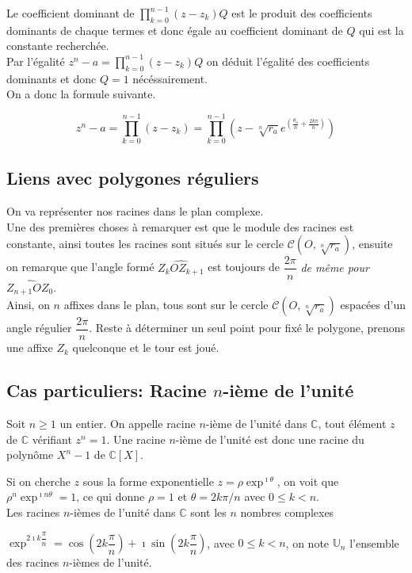 \documentclass[french]{book}
\newcommand{\bbc}{\mathbb {C}}
\newcommand{\se}{\geq}
\newcommand{\ie}{\leq}
\newcommand{\calc}{\mathscr{C}}
\begin{document}
Le coefficient dominant de $\prod^{n-1}_{k=0}(z-z_k)Q$ est le produit des coefficients dominants de chaque termes et donc égale au coefficient dominant de $Q$ qui est la constante recherchée.\\

Par l'égalité $z^n-a=\prod^{n-1}_{k=0}(z-z_k)Q$ on déduit l'égalité des coefficients dominants et donc $Q=1$ nécéssairement. \\

On a donc la formule suivante. 

$$z^n-a= \prod^{n-1}_{k=0}(z-z_k) =\prod^{n-1}_{k=0}(z-\sqrt[n]{r_a}e^{(  
\frac{\theta_a}{n} +\frac{2k\pi}{n} )} )$$

\subsection{Liens avec polygones réguliers}
On va représenter nos racines dans le plan complexe.\\

Une des premières choses à remarquer est que le module des racines est constante, ainsi toutes les racines sont situés sur le cercle $\calc (O,\sqrt[n]{r_a})$, ensuite on remarque que l'angle formé $\widehat{Z_kOZ_{k+1}}$ est toujours de $\dfrac{2\pi}{n}$ \emph{de même pour $\widehat{Z_{n+1}OZ_0}$}.\\

Ainsi, on $n$ affixes dans le plan,  tous sont sur le cercle $\calc (O,\sqrt[n]{r_a})$ espacées d'un angle régulier  $\dfrac{2\pi}{n}$. Reste à déterminer un seul point pour fixé le polygone, prenons une affixe $Z_k$ quelconque et le tour est joué.


\subsection{Cas particuliers: Racine  $n$-ième de l'unité}
Soit $n\se 1$ un entier. On appelle racine $n$-ième de l'unité dans  $\bbc$, tout élément $z$ de $\bbc$ vérifiant $z^n=1$. Une racine $n$-ième de l'unité est donc une racine du polynôme $X^n-1$ de $\bbc [X]$.\par
Si on cherche $z$ sous la forme exponentielle $z=\rho\exp^{\imath \theta}$, on voit que $\rho^n\exp^{\imath n\theta}=1$, ce qui donne $\rho=1$ et $\theta=2k\pi/n$ avec $0\ie k<n$.\\

 Les racines  $n$-ièmes de l'unité dans $\bbc$ sont les $n$ nombres complexes

 $\exp^{2\imath k\dfrac{\pi}{n}}=\cos(2k\dfrac{\pi}{n})+\imath\sin(2k\dfrac{\pi}{n})$,  avec $0\ie k<n$, on note $\mathbb{U}_n$ l'ensemble des racines $n$-ièmes de l'unité. \\
 
\end{document}
